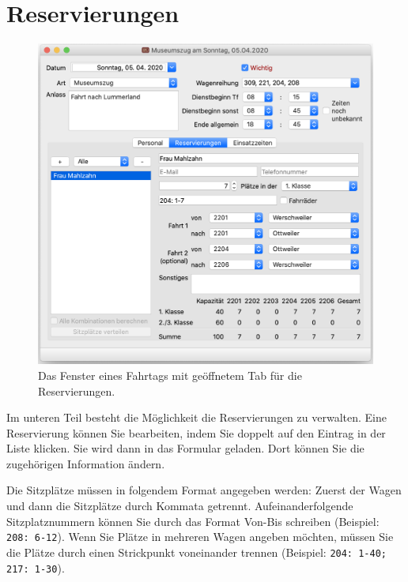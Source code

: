 \section{Reservierungen}
\begin{figure}[!h]
	\includegraphics[width=\textwidth]{img/fahrtag_reservierungen}
	\caption{Das Fenster eines Fahrtags mit geöffnetem Tab für die Reservierungen.}
	\label{fig:fahrtag:reservierungen}
\end{figure}
Im unteren Teil besteht die Möglichkeit die Reservierungen zu verwalten.
Eine Reservierung können Sie bearbeiten, indem Sie doppelt auf den Eintrag in der Liste klicken.
Sie wird dann in das Formular geladen. Dort können Sie die zugehörigen Information ändern.


Die Sitzplätze müssen in folgendem Format angegeben werden:
Zuerst der Wagen und dann die Sitzplätze durch Kommata getrennt.
Aufeinanderfolgende Sitzplatznummern können Sie durch das Format Von-Bis schreiben (Beispiel: \texttt{208: 6-12}).
Wenn Sie Plätze in mehreren Wagen angeben möchten,
müssen Sie die Plätze durch einen Strickpunkt voneinander trennen
(Beispiel: \texttt{204: 1-40; 217: 1-30}).


